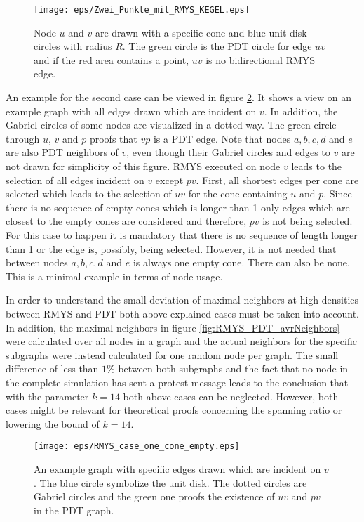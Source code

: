 \begin{figure}[h!]
\centering
\texttt{[image: eps/Zwei\_Punkte\_mit\_RMYS\_KEGEL.eps]}
\caption{Node $u $ and $v $ are drawn with a specific cone and blue unit disk circles with radius $R $. The green circle is the PDT circle for edge $uv $ and if the red area contains a point, $uv $ is no bidirectional RMYS edge.}
\label{fig:RMYS_ErrorBiderectionalEdges}
\end{figure}

An example for the second case can be viewed in figure \ref{fig:RMYS_case_one_cone_empty}.
It shows a view on an example graph with all edges drawn which are incident on $v $.
In addition, the Gabriel circles of some nodes are visualized in a dotted way.
The green circle through $u $, $v $ and $p $ proofs that $vp $ is a PDT edge.
Note that nodes $a,b,c,d $ and $e $ are also PDT neighbors of $v $, even though their Gabriel circles and edges to $v $ are not drawn for simplicity of this figure.
RMYS executed on node $v $ leads to the selection of all edges incident on $v $ except $pv $.
First, all shortest edges per cone are selected which leads to the selection of $uv $ for the cone containing $u $ and $p $.
Since there is no sequence of empty cones which is longer than 1 only edges which are closest to the empty cones are considered and therefore, $pv $ is not being selected.
For this case to happen it is mandatory that there is no sequence of length longer than 1 or the edge is, possibly, being selected.
However, it is not needed that between nodes $a,b,c,d $ and $e $ is always one empty cone.
There can also be none.
This is a minimal example in terms of node usage.

In order to understand the small deviation of maximal neighbors at high densities between RMYS and PDT both above explained cases must be taken into account.
In addition, the maximal neighbors in figure \ref{fig:RMYS_PDT_avrNeighbors} were calculated over all nodes in a graph and the actual neighbors for the specific subgraphs were instead calculated for one random node per graph.
The small difference of less than $1 \% $ between both subgraphs and the fact that no node in the complete simulation has sent a protest message leads to the conclusion that with the parameter $k = 14 $ both above cases can be neglected.
However, both cases might be relevant for theoretical proofs concerning the spanning ratio or lowering the bound of $k = 14 $.


\begin{figure}[h!]
\centering
\texttt{[image: eps/RMYS\_case\_one\_cone\_empty.eps]}
\caption{An example graph with specific edges drawn which are incident on $v $. The blue circle symbolize the unit disk. The dotted circles are Gabriel circles and the green one proofs the existence of $uv $ and $pv $ in the PDT graph.}
\label{fig:RMYS_case_one_cone_empty}
\end{figure}

